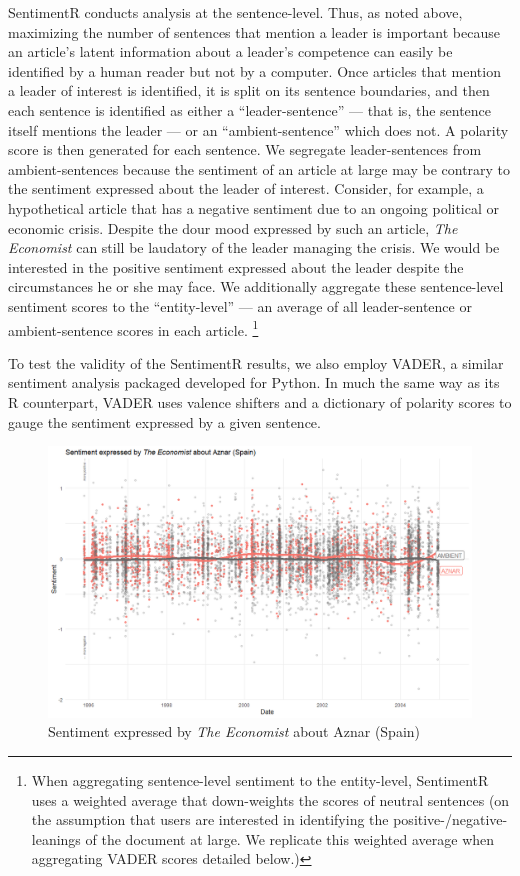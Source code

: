 \documentclass[11pt, letterpaper, twoside]{article}
\begin{document}
SentimentR conducts analysis at the sentence-level. Thus, as noted above, maximizing the number of sentences that mention a leader is important because an article's latent information about a leader's competence can easily be identified by a human reader but not by a computer. Once articles that mention a leader of interest is identified, it is split on its sentence boundaries, and then each sentence is identified as either a ``leader-sentence'' --- that is, the sentence itself mentions the leader --- or an ``ambient-sentence'' which does not. A polarity score is then generated for each sentence. We segregate leader-sentences from ambient-sentences because the sentiment of an article at large may be contrary to the sentiment expressed about the leader of interest. Consider, for example, a hypothetical article that has a negative sentiment due to an ongoing political or economic crisis. Despite the dour mood expressed by such an article, \textit{The Economist} can still be laudatory of the leader managing the crisis. We would be interested in the positive sentiment expressed about the leader despite the circumstances he or she may face.  We additionally aggregate these sentence-level sentiment scores to the ``entity-level'' --- an average of all leader-sentence or ambient-sentence scores in each article. \footnote{When aggregating sentence-level sentiment to the entity-level, SentimentR uses a weighted average that down-weights the scores of neutral sentences (on the assumption that users are interested in identifying the positive-/negative- leanings of the document at large. We replicate this weighted average when aggregating VADER scores detailed below.)} 

To test the validity of the SentimentR results, we also employ VADER, a similar sentiment analysis packaged developed for Python. In much the same way as its R counterpart, VADER uses valence shifters and a dictionary of polarity scores to gauge the sentiment expressed by a given sentence.

\begin{figure} %
    \caption{Sentiment expressed by \textit{The Economist} about Aznar (Spain)}
    \centering
    \includegraphics[clip, width=\textwidth]{figures/aznarA29-4231_leader_figure.png}
\end{figure}
\end{document}
